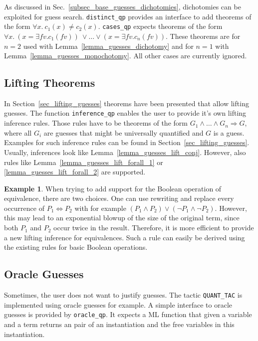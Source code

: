 \documentclass[a4paper,12pt,DIV=12,oneside]{scrbook}
\newcommand{\fv}{\textit{fv}}
\theoremstyle{definition}
\newtheorem{example}[lemma]{Example}
\theoremstyle{remark}
\begin{document}
As discussed in Sec.~\ref{subsec_base_guesses_dichotomies}, dichotomies can be exploited for guess search.
\texttt{distinct\_qp} provides an interface to add theorems
of the form $\forall x.\ c_1(x) \neq c_2(x)$.
\texttt{cases\_qp} expects theorems of the form
$\forall x. \ (x = \exists \fv. c_1(\fv))\ \vee \ldots \vee (x = \exists \fv. c_n(\fv))$.
These theorems are for $n = 2$ used with Lemma~\ref{lemma_guesses_dichotomy} and
for $n=1$ with Lemma~\ref{lemma_guesses_monochotomy}. All other cases are currently ignored.

\subsection{Lifting Theorems}

In Section~\ref{sec_lifting_guesses} theorems have been presented that
allow lifting guesses. The function \texttt{inference\_qp} enables the
user to provide it's own lifting inference rules. Those rules have to
be theorems of the form $G_1 \wedge \ldots \wedge G_n \Longrightarrow
G$, where all $G_i$ are guesses that might be universally quantified
and $G$ is a guess. Examples for such inference rules can be found in
Section~\ref{sec_lifting_guesses}. Usually, inferences look like
Lemma~\ref{lemma_guesses_lift_conj}. However, also rules like
Lemma~\ref{lemma_guesses_lift_forall_1} or
\ref{lemma_guesses_lift_forall_2} are supported.

\begin{example}
When trying to add support for the Boolean operation of equivalence,
there are two choices.  One can use rewriting and replace every
occurrence of $P_1 \Leftrightarrow P_2$ with for example $(P_1 \wedge
P_2) \vee (\neg P_1 \wedge \neg P_2)$. However, this may lead to an
exponential blowup of the size of the original term, since both $P_1$
and $P_2$ occur twice in the result. Therefore, it is more efficient to
provide a new lifting inference for equivalences. Such a rule can easily be derived
using the existing rules for basic Boolean operations.
\end{example}

\subsection{Oracle Guesses}

Sometimes, the user does not want to justify guesses. The tactic
\texttt{QUANT\_TAC} is implemented using oracle guesses for example.
A simple interface to oracle guesses is provided by \texttt{oracle\_qp}.
It expects a ML function that given a variable and a term returns
an pair of an instantiation and the free variables in this instantiation.
\end{document}
